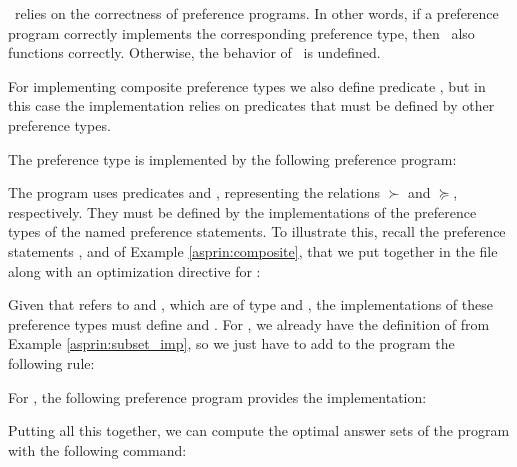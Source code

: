 \begin{note}
\asprin\ relies on the correctness of preference programs. 
In other words, 
if a preference program correctly implements the corresponding preference type,
then \asprin\ also functions correctly.
Otherwise, the behavior of \asprin\ is undefined.
\end{note}

For implementing composite preference types 
we also define predicate ,
but in this case the implementation relies on predicates 
that must be defined by other preference types.

\begin{example}
The preference type  is implemented by the following preference program:
%

%
The program uses predicates  and ,
representing the relations $\succ$ and $\succeq$, respectively. 
They must be defined by the implementations of the preference types of the named preference statements.
To illustrate this, recall the preference statements ,  and  of Example \ref{asprin:composite}, 
that we put together in the file  along with an optimization directive for :
%

%
Given that  refers to  and , which are of type  and , 
the implementations of these preference types must define  and .
For , we already have the definition of  from Example \ref{asprin:subset_imp}, 
so we just have to add to the program  the following rule:
%

%
For , the following preference program provides the implementation:
%

%
Putting all this together, we can compute the optimal answer sets of the program
with the following command:
\end{example}
